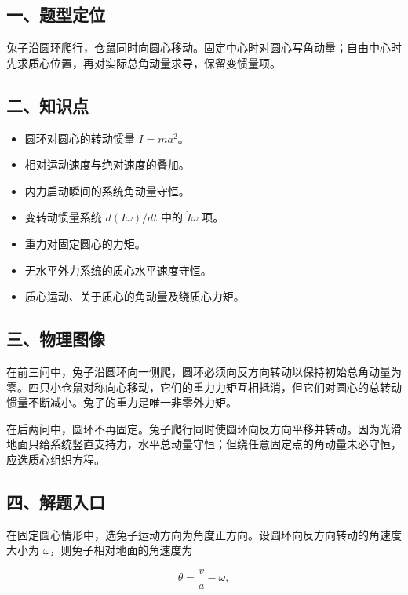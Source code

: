 \documentclass[12pt,a4paper,UTF8]{ctexart}
\newcommand{\tightlist}{\setlength{\itemsep}{0pt}\setlength{\parskip}{0pt}}
\begin{document}
\subsection{一、题型定位}\label{ux4e00ux9898ux578bux5b9aux4f4d-7}

兔子沿圆环爬行，仓鼠同时向圆心移动。固定中心时对圆心写角动量；自由中心时先求质心位置，再对实际总角动量求导，保留变惯量项。

\subsection{二、知识点}\label{ux4e8cux77e5ux8bc6ux70b9-7}

\begin{itemize}
\tightlist
\item
  圆环对圆心的转动惯量 \(I=ma^2\)。
\item
  相对运动速度与绝对速度的叠加。
\item
  内力启动瞬间的系统角动量守恒。
\item
  变转动惯量系统 \(d(I\omega)/dt\) 中的 \(\dot I\omega\) 项。
\item
  重力对固定圆心的力矩。
\item
  无水平外力系统的质心水平速度守恒。
\item
  质心运动、关于质心的角动量及绕质心力矩。
\end{itemize}

\subsection{三、物理图像}\label{ux4e09ux7269ux7406ux56feux50cf-7}

在前三问中，兔子沿圆环向一侧爬，圆环必须向反方向转动以保持初始总角动量为零。四只小仓鼠对称向心移动，它们的重力力矩互相抵消，但它们对圆心的总转动惯量不断减小。兔子的重力是唯一非零外力矩。

在后两问中，圆环不再固定。兔子爬行同时使圆环向反方向平移并转动。因为光滑地面只给系统竖直支持力，水平总动量守恒；但绕任意固定点的角动量未必守恒，应选质心组织方程。

\subsection{四、解题入口}\label{ux56dbux89e3ux9898ux5165ux53e3-7}

在固定圆心情形中，选兔子运动方向为角度正方向。设圆环向反方向转动的角速度大小为
\(\omega\)，则兔子相对地面的角速度为

\[\dot\theta=\frac va-\omega,\]
\end{document}
